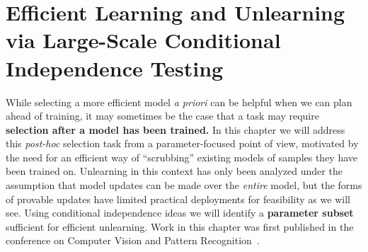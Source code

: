 \chapter{Efficient Learning and Unlearning via Large-Scale Conditional Independence Testing} \label{chap:lcodec} 

While selecting a more efficient model \textit{a priori}
can be helpful when we can plan ahead of training,
it may sometimes be the case
that a task may require \textbf{selection
after a model has been trained.}
In this chapter we will 
address this \textit{post-hoc} selection task
from a parameter-focused point of view,
motivated by the need for an efficient way of 
``scrubbing'' existing models of samples
they have been trained on.
Unlearning in this context has
only been analyzed under the assumption
that model updates can be made over the \textit{entire} model,
but the forms of provable updates have limited
practical deployments for feasibility
as we will see.
Using conditional independence ideas
we will identify a \textbf{parameter subset} sufficient for
efficient unlearning.
Work in this chapter was first published
in the conference on Computer Vision and Pattern Recognition~\citep{lcodecunlearn}.









